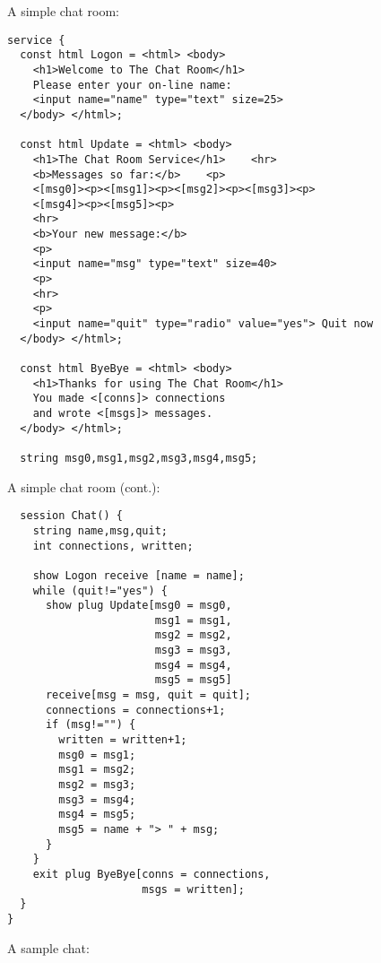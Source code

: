 \begin{slide*}
A simple chat room:

\begin{scriptsize}
\begin{verbatim}
service {  
  const html Logon = <html> <body>
    <h1>Welcome to The Chat Room</h1>    
    Please enter your on-line name:
    <input name="name" type="text" size=25>
  </body> </html>;

  const html Update = <html> <body>
    <h1>The Chat Room Service</h1>    <hr>
    <b>Messages so far:</b>    <p>
    <[msg0]><p><[msg1]><p><[msg2]><p><[msg3]><p>
    <[msg4]><p><[msg5]><p>
    <hr>
    <b>Your new message:</b>
    <p>
    <input name="msg" type="text" size=40>
    <p>
    <hr>
    <p>
    <input name="quit" type="radio" value="yes"> Quit now
  </body> </html>;

  const html ByeBye = <html> <body>
    <h1>Thanks for using The Chat Room</h1>
    You made <[conns]> connections
    and wrote <[msgs]> messages.
  </body> </html>;

  string msg0,msg1,msg2,msg3,msg4,msg5;
\end{verbatim}
\end{scriptsize}
\vfil
\end{slide*}

\begin{slide*}
A simple chat room (cont.):
\begin{scriptsize}
\begin{verbatim}
  session Chat() {
    string name,msg,quit;
    int connections, written;
    
    show Logon receive [name = name];
    while (quit!="yes") {
      show plug Update[msg0 = msg0,
                       msg1 = msg1,
                       msg2 = msg2,
                       msg3 = msg3,
                       msg4 = msg4,
                       msg5 = msg5]
      receive[msg = msg, quit = quit];
      connections = connections+1;
      if (msg!="") {
        written = written+1;
        msg0 = msg1;
        msg1 = msg2;
        msg2 = msg3;
        msg3 = msg4;
        msg4 = msg5;
        msg5 = name + "> " + msg;
      }
    }
    exit plug ByeBye[conns = connections,
                     msgs = written];
  }
}
\end{verbatim}
\end{scriptsize}
\vfil
\end{slide*}

\begin{slide*}
A sample chat:\\

\begin{center}
\end{center}
\vfil
\end{slide*}

